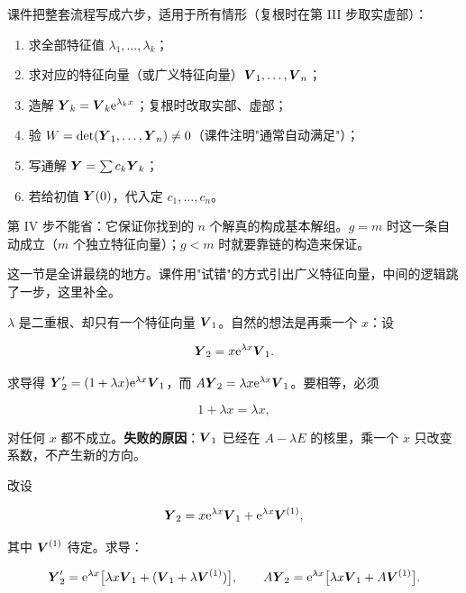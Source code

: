 \documentclass[11pt]{ctexart}
\begin{document}

课件把整套流程写成六步，适用于所有情形（复根时在第 III 步取实虚部）：

\begin{enumerate}
  \item 求全部特征值 $\lambda_1,\dots,\lambda_k$；
  \item 求对应的特征向量（或广义特征向量）$\boldsymbol{V}_1,\dots,\boldsymbol{V}_n$；
  \item 造解 $\boldsymbol{Y}_k=\boldsymbol{V}_k\mathrm{e}^{\lambda_kx}$；复根时改取实部、虚部；
  \item 验 $W=\det(\boldsymbol{Y}_1,\dots,\boldsymbol{Y}_n)\neq0$（课件注明"通常自动满足"）；
  \item 写通解 $\boldsymbol{Y}=\sum c_k\boldsymbol{Y}_k$；
  \item 若给初值 $\boldsymbol{Y}(0)$，代入定 $c_1,\dots,c_n$。
\end{enumerate}

第 IV 步不能省：它保证你找到的 $n$ 个解真的构成基本解组。$g=m$ 时这一条自动成立（$m$ 个独立特征向量）；$g<m$ 时就要靠链的构造来保证。


这一节是全讲最绕的地方。课件用"试错"的方式引出广义特征向量，中间的逻辑跳了一步，这里补全。


$\lambda$ 是二重根、却只有一个特征向量 $\boldsymbol{V}_1$。自然的想法是再乘一个 $x$：设

\[
\boldsymbol{Y}_2=x\mathrm{e}^{\lambda x}\boldsymbol{V}_1 .
\]

求导得 $\boldsymbol{Y}_2'=(1+\lambda x)\mathrm{e}^{\lambda x}\boldsymbol{V}_1$，而 $A\boldsymbol{Y}_2=\lambda x\mathrm{e}^{\lambda x}\boldsymbol{V}_1$。要相等，必须

\[
1+\lambda x=\lambda x,
\]

对任何 $x$ 都不成立。\textbf{失败的原因}：$\boldsymbol{V}_1$ 已经在 $A-\lambda E$ 的核里，乘一个 $x$ 只改变系数，不产生新的方向。


改设

\[
\boldsymbol{Y}_2=x\mathrm{e}^{\lambda x}\boldsymbol{V}_1+\mathrm{e}^{\lambda x}\boldsymbol{V}^{(1)},
\]

其中 $\boldsymbol{V}^{(1)}$ 待定。求导：

\[
\boldsymbol{Y}_2'=\mathrm{e}^{\lambda x}\bigl[\lambda x\boldsymbol{V}_1+(\boldsymbol{V}_1+\lambda\boldsymbol{V}^{(1)})\bigr],
\qquad
A\boldsymbol{Y}_2=\mathrm{e}^{\lambda x}\bigl[\lambda x\boldsymbol{V}_1+A\boldsymbol{V}^{(1)}\bigr].
\]
\end{document}

